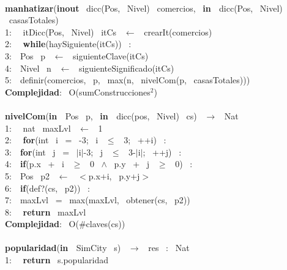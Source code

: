 \begin{Algoritmos}
    \makebox[\linewidth]{\rule{\textwidth}{0.4pt}}
    \\
    \makebox[\linewidth]{\rule{\textwidth}{0.4pt}}
    \textbf{manhatizar}(\textbf{inout} \ dicc(Pos, \ Nivel) \ comercios, \ \textbf{in \ }dicc(Pos, \ Nivel) \ casasTotales) \ \\
    1: \  \ itDicc(Pos, \ Nivel) \ itCs \ $\leftarrow$ \ crearIt(comercios)\\
    2: \  \ \textbf{while}(haySiguiente(itCs)) \ :\\
    3:\indent  \  \ Pos \ p \ $\leftarrow$ \ siguienteClave(itCs)\\
    4:\indent  \  \ Nivel \ n \ $\leftarrow$ \ siguienteSignificado(itCs)\\
    5:\indent  \  \ definir(comercios, \ p, \ max(n, \ nivelCom(p, \ casasTotales)))\\
    \textbf{Complejidad}: \ O(sumConstrucciones$^2$)\\
    \makebox[\linewidth]{\rule{\textwidth}{0.4pt}}
    \\
    \makebox[\linewidth]{\rule{\textwidth}{0.4pt}}
    \textbf{nivelCom}(\textbf{in \ }Pos \ p, \ \textbf{in \ }dicc(pos, \ Nivel) \ cs) \ $\rightarrow $ \ Nat\\
    1: \  \ nat \ maxLvl \ $\leftarrow$ \ 1\\
    2: \  \ \textbf{for}(int \ i \ = \ -3; \ i \ $\leq$ \ 3; \ ++i) \ :\\
    3:\indent  \  \ \textbf{for}(int \ j \ = \ $\mid$i$\mid$-3; \ j \ $\leq$ \ 3-$\mid$i$\mid$; \ ++j) \ :\\
    4:\indent \indent  \  \ \textbf{if}(p.x \ + \ i \ $\geq$ \ 0 \ $\wedge$ \ p.y \ + \ j \ $\geq$ \ 0) \ :\\
    5:\indent \indent \indent  \  \ Pos \ p2 \ $\leftarrow$ \ $<$p.x+i, \ p.y+j$>$ \ \\
    6:\indent \indent \indent  \  \ \textbf{if}(def?(cs, \ p2)) \ :\\
    7:\indent \indent \indent \indent  \  \ maxLvl \ = \ max(maxLvl, \ obtener(cs, \ p2))\\
    8: \  \ \textbf{return} \ maxLvl\\
    \textbf{Complejidad}: \ O($ \# $claves(cs))\\
    \makebox[\linewidth]{\rule{\textwidth}{0.4pt}}
    \\
    \makebox[\linewidth]{\rule{\textwidth}{0.4pt}}
    \textbf{popularidad}(\textbf{in \ }SimCity \ s) \ $\rightarrow $ \ res \ : \ Nat\\
    1: \  \ \textbf{return} \ s.popularidad\\

\end{Algoritmos}
